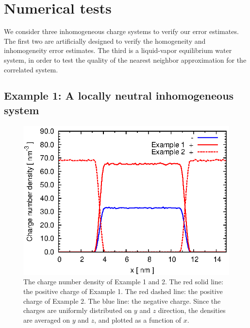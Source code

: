 \documentclass[journal=jacsat,manuscript=article]{achemso}
\begin{document}
\section{Numerical tests}\label{sec:tmp3}

We consider three inhomogeneous charge systems to verify our error
estimates.
The first two are artificially designed to verify the 
homogeneity and inhomogeneity error estimates. The third is a 
liquid-vapor equilibrium water system, in order to test the
quality  of the nearest neighbor approximation for the correlated system.  


\subsection{Example 1: A locally neutral inhomogeneous system}
\label{sec:example1}

\begin{figure}
  \centering
  \includegraphics[]{fig.rho.eps}
  \caption{
    The charge number density  of Example 1 and 2.
    The red solid line: the positive charge of Example 1.
    The red dashed line: the positive charge of Example 2.
    The blue line: the negative charge.
    Since the charges are uniformly distributed
    on $y$ and $z$ direction, the densities are averaged on $y$ and $z$,
    and plotted as a
    function of $x$.
  }
  \label{fig:tmp-rho}
\end{figure}
\end{document}
